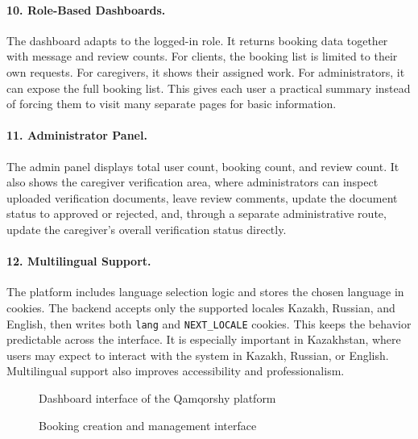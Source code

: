 \documentclass[12pt,a4paper]{article}
\begin{document}
\paragraph{10. Role-Based Dashboards.}
The dashboard adapts to the logged-in role. It returns booking data together with message and review counts. For clients, the booking list is limited to their own requests. For caregivers, it shows their assigned work. For administrators, it can expose the full booking list. This gives each user a practical summary instead of forcing them to visit many separate pages for basic information.

\paragraph{11. Administrator Panel.}
The admin panel displays total user count, booking count, and review count. It also shows the caregiver verification area, where administrators can inspect uploaded verification documents, leave review comments, update the document status to approved or rejected, and, through a separate administrative route, update the caregiver's overall verification status directly.

\paragraph{12. Multilingual Support.}
The platform includes language selection logic and stores the chosen language in cookies. The backend accepts only the supported locales Kazakh, Russian, and English, then writes both \texttt{lang} and \texttt{NEXT\_LOCALE} cookies. This keeps the behavior predictable across the interface. It is especially important in Kazakhstan, where users may expect to interact with the system in Kazakh, Russian, or English. Multilingual support also improves accessibility and professionalism.

\begin{figure}[H]
\centering
{}
\caption{Dashboard interface of the Qamqorshy platform}
\label{fig:dashboard-placeholder}
\end{figure}

\begin{figure}[H]
\centering
{}
\caption{Booking creation and management interface}
\label{fig:booking-placeholder}
\end{figure}
\end{document}
